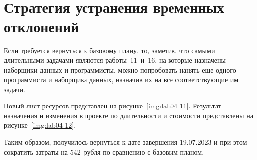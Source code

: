 \clearpage
\section{Стратегия устранения временных отклонений}

Если требуется вернуться к базовому плану, то, заметив, что самыми длительными задачами являются работы~11~и~16, на которые назначены наборщики данных и программисты, можно попробовать нанять еще одного программиста и наборщика данных, назначив их на все соответствующие им задачи.

Новый лист ресурсов представлен на рисунке~\ref{img:lab04-11}. Результат назначения и изменения в проекте по длительности и стоимости представлены на рисунке~\ref{img:lab04-12}.



Таким образом, получилось вернуться к дате завершения 19.07.2023 и при этом сократить затраты на 542~рубля по сравнению с базовым планом.
